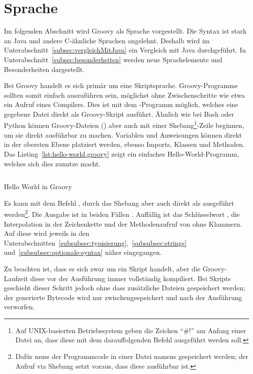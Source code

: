 \documentclass[a4paper]{article}
\newcommand{\codelisting}[3]{
\begin{listing}[ht]
	\inputminted{#1}{#1/#2}
	\vspace{-3ex}
	\caption{#3}
	\label{lst:#2}
\end{listing}
}
\begin{document}

\section{Sprache}\label{sec:sprache}

Im folgenden Abschnitt wird Groovy als Sprache vorgestellt.
Die Syntax ist stark an Java und andere C-ähnliche Sprachen angelehnt.
Deshalb wird im Unterabschnitt~\ref{subsec:vergleichMitJava} ein Vergleich mit Java durchgeführt.
In Unterabschnitt~\ref{subsec:besonderheiten} werden neue Sprachelemente und Besonderheiten dargestellt.

Bei Groovy handelt es sich primär um eine Skriptsprache.
Groovy-Programme sollten somit einfach auszuführen sein, möglichst ohne Zwischenschritte wie etwa ein Aufruf eines Compilers.
Dies ist mit dem -Programm möglich, welches eine gegebene Datei direkt als Groovy-Skript ausführt.
Ähnlich wie bei Bash oder Python können Groovy-Dateien () aber auch mit einer Shebang\footnote{Auf UNIX-basierten Betriebssystem geben die Zeichen ``\#!'' am Anfang einer Datei an, dass diese mit dem darauffolgenden Befehl ausgeführt werden soll.}-Zeile beginnen, um sie direkt ausführbar zu machen.
Variablen und Anweisungen können direkt in der obersten Ebene platziert werden, ebenso Imports, Klassen und Methoden.
Das Listing~\ref{lst:hello-world.groovy} zeigt ein einfaches Hello-World-Programm, welches sich dies zunutze macht.

\codelisting{groovy}{hello-world.groovy}{Hello World in Groovy}

Es kann mit dem Befehl , durch das Shebang aber auch direkt als  ausgeführt werden\footnote{Dafür muss der Programmcode in einer Datei namens  gespeichert werden; der Aufruf via Shebang setzt voraus, dass diese ausführbar ist.}.
Die Ausgabe ist in beiden Fällen .
Auffällig ist das Schlüsselwort , die Interpolation in der Zeichenkette und der Methodenaufruf von  ohne Klammern.
Auf diese wird jeweils in den Unterabschnitten~\ref{subsubsec:typisierung},~\ref{subsubsec:strings} und~\ref{subsubsec:optionale-syntax} näher eingegangen.

Zu beachten ist, dass es sich zwar um ein Skript handelt, aber die Groovy-Laufzeit diese vor der Ausführung immer vollständig kompiliert.
Bei Skripts geschieht dieser Schritt jedoch ohne dass zusätzliche Dateien gespeichert werden;
der generierte Bytecode wird nur zwischengespeichert und nach der Ausführung verworfen.
\end{document}
